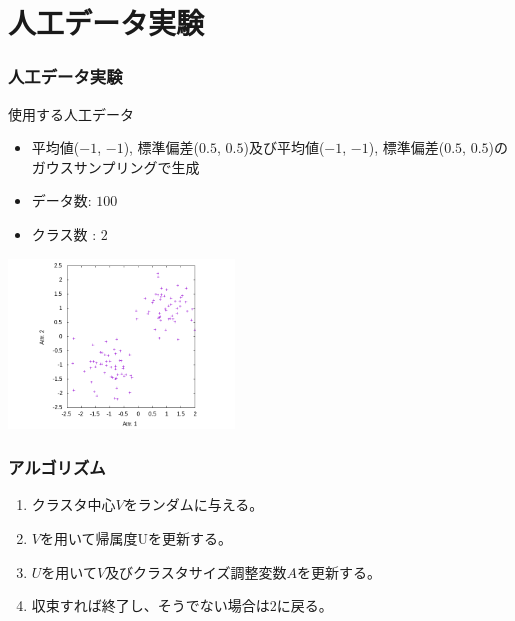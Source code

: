 \documentclass[13pt,dvipdfmx]{beamer}
\begin{document}
\section{人工データ実験}
\begin{frame}\frametitle{人工データ実験}
  \begin{block}{使用する人工データ}
    \begin{itemize}
    \item 平均値($-1$, $-1$), 標準偏差($0.5$, $0.5$)及び平均値($-1$, $-1$), 標準偏差($0.5$, $0.5$)のガウスサンプリングで生成
    \item データ数: $100$
    \item クラス数 : $2$
    \end{itemize}
    \begin{center}
     \includegraphics[width=60mm]{2d-dat.png}
    \end{center}
  \end{block}
\end{frame}

\begin{frame}\frametitle{アルゴリズム}
  \begin{enumerate}
  \item クラスタ中心$V$をランダムに与える。
  \item $V$を用いて帰属度Uを更新する。
  \item $U$を用いて$V$及びクラスタサイズ調整変数$A$を更新する。
  \item 収束すれば終了し、そうでない場合は$2$に戻る。
  \end{enumerate}
\end{frame}
\end{document}
